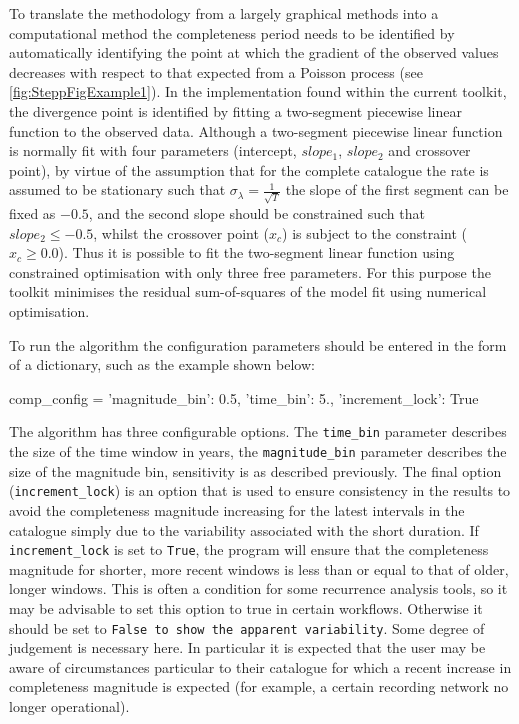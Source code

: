 To translate the methodology from a largely graphical methods into a computational method the completeness period needs to be identified by automatically identifying the point at which the gradient of the observed values decreases with respect to that expected from a Poisson process (see \ref{fig:SteppFigExample1}). In the implementation found within the current toolkit, the divergence point is identified by fitting a two-segment piecewise linear function to the observed data. Although a two-segment piecewise linear function is normally fit with four parameters (intercept, $slope_1$, $slope_2$ and crossover point), by virtue of the assumption that for the complete catalogue the rate is assumed to be stationary such that $\sigma_{\lambda} = \frac{1}{\sqrt{T}}$ the slope of the first segment can be fixed as $-0.5$, and the second slope should be constrained such that $slope_2 \leq -0.5$, whilst the crossover point ($x_c$) is subject to the constraint ($x_c \geq 0.0$). Thus it is possible to fit the two-segment linear function using constrained optimisation with only three free parameters. For this purpose the toolkit minimises the residual sum-of-squares of the model fit using numerical optimisation. 

To run the \cite{Stepp1971} algorithm the configuration parameters should be entered in the form of a dictionary, such as the example shown below:

\begin{python}[frame=single]
comp_config = {'magnitude_bin': 0.5,
               'time_bin': 5.,
               'increment_lock': True}
\end{python}

The algorithm has three configurable options. The \verb=time_bin= parameter describes the size of the time window in years, the \verb=magnitude_bin= parameter describes the size of the magnitude bin, sensitivity is as described previously. The final option (\verb=increment_lock=) is an option that is used to ensure consistency in the results to avoid the completeness magnitude increasing for the latest intervals in the catalogue simply due to the variability associated with the short duration. If \verb=increment_lock= is set to \verb=True=, the program will ensure that the completeness magnitude for shorter, more recent windows is less than or equal to that of older, longer windows. This is often a condition for some recurrence analysis tools, so it may be advisable to set this option to true in certain workflows. Otherwise it should be set to \verb=False to show the apparent variability=. Some degree of judgement is necessary here. In particular it is expected that the user may be aware of circumstances particular to their catalogue for which a recent increase in completeness magnitude is expected (for example, a certain recording network no longer operational).  


